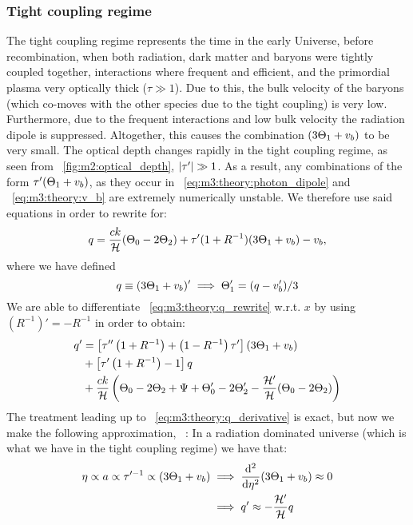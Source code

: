 \subsubsection{Tight coupling regime}
    The tight coupling regime represents the time in the early Universe, before recombination, when both radiation, dark matter and baryons were tightly coupled together, interactions where frequent and efficient, and the primordial plasma very optically thick ($\tau\gg1$). Due to this, the bulk velocity of the baryons (which co-moves with the other species due to the tight coupling) is very low. Furthermore, due to the frequent interactions and low bulk velocity the radiation dipole is suppressed. Altogether, this causes the combination $(3\Theta_1+v_b)$ to be very small. The optical depth changes rapidly in the tight coupling regime, as seen from ~\cref{fig:m2:optical_depth}, $\abs{\tau'}\gg1$. As a result, any combinations of the form $\tau'(\Theta_1+v_b)$, as they occur in ~\cref{eq:m3:theory:photon_dipole} and ~\cref{eq:m3:theory:v_b} are extremely numerically unstable. We therefore use said equations in order to rewrite for:
    \begin{equation}\label{eq:m3:theory:q_rewrite}
        q = \frac{ck}{\mathcal{H}}(\Theta_0-2\Theta_2) + \tau'(1+R^{-1})(3\Theta_1+v_b) - v_b,
    \end{equation}
    where we have defined 
    \begin{equation}\label{eq:m3:theory:q_def}
        q\equiv (3\Theta_1+v_b)' \implies \Theta_1'=(q-v_b')/3
    \end{equation}
    We are able to differentiate ~\cref{eq:m3:theory:q_rewrite} w.r.t. $x$ by using $(R^{-1})' = -R^{-1}$ in order to obtain:
    \begin{equation}\label{eq:m3:theory:q_derivative}
        \begin{split}
            q' &= \left[\tau''\left(1+R^{-1}\right)+\left(1-R^{-1}\right)\tau'\right](3\Theta_1+v_b)\\
            &+\left[\tau'\left(1+R^{-1}\right)-1\right]q \\
            &+\frac{ck}{\mathcal{H}}\left(\Theta_0-2\Theta_2+\Psi+\Theta_0'-2\Theta_2'-\frac{\mathcal{H}'}{\mathcal{H}}(\Theta_0-2\Theta_2)\right)
        \end{split}
    \end{equation}
    The treatment leading up to ~\cref{eq:m3:theory:q_derivative} is exact, but now we make the following approximation, ~\cite{AST5220LectureNotes}: In a radiation dominated universe (which is what we have in the tight coupling regime) we have that:
    \begin{equation}\label{eq:m3:theory:tight_coupling_approximation}
        \begin{split}
        \eta\propto a\propto \tau'^{-1}\propto(3\Theta_1+v_b) &\implies \dv[2]{\eta}(3\Theta_1+v_b)\approx 0 \\
        &\implies q' \approx -\frac{\mathcal{H}'}{\mathcal{H}}q
        \end{split}
    \end{equation}
